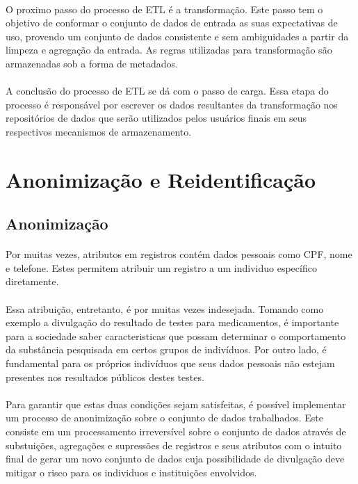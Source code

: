 \paragraph{} O proximo passo do processo de ETL é a transformação. Este passo tem o objetivo de conformar o conjunto de dados de entrada as suas expectativas de uso, provendo um conjunto de dados consistente e sem ambiguidades a partir da limpeza e agregação da entrada. As regras utilizadas para transformação são armazenadas sob a forma de metadados.

\paragraph{} A conclusão do processo de ETL se dá com o passo de carga. Essa etapa do processo é responsável por escrever os dados resultantes da transformação nos repositórios de dados que serão utilizados pelos usuários finais em seus respectivos mecanismos de armazenamento.

\section{Anonimização e Reidentificação}

\subsection{Anonimização}

\paragraph{} Por muitas vezes, atributos em registros contém dados pessoais como CPF, nome e telefone. Estes permitem atribuir um registro a um individuo específico diretamente. 

\paragraph{} Essa atribuição, entretanto, é por muitas vezes indesejada. Tomando como exemplo a divulgação do resultado de testes para medicamentos, é importante para a sociedade saber caracteristicas que possam determinar o comportamento da 
substância pesquisada em certos grupos de indivíduos. Por outro lado, é fundamental para os próprios indivíduos que seus dados pessoais não estejam presentes nos resultados públicos destes testes. 

\paragraph{} Para garantir que estas duas condições sejam satisfeitas, é possível implementar um processo de anonimização sobre o conjunto de dados trabalhados. Este consiste em um processamento irreversível\cite{dias2016multilingual} sobre o conjunto de dados através de substuições, agregações e supressões de registros e seus atributos com o intuito final de gerar um novo conjunto de dados cuja possibilidade de divulgação deve mitigar o risco para os individuos e instituições envolvidos. 

